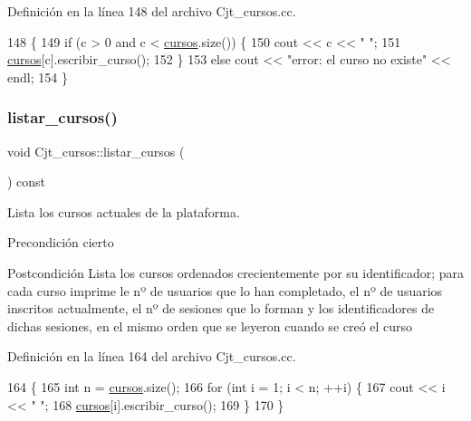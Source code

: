 Definición en la línea 148 del archivo Cjt\+\_\+cursos.\+cc.


\begin{DoxyCode}
148                                                \{
149       \textcolor{keywordflow}{if} (c > 0 and c < \mbox{\hyperlink{class_cjt__cursos_a582f9540bc295212450dba4cd18c8886}{cursos}}.size()) \{
150         cout << c << \textcolor{stringliteral}{" "};
151         \mbox{\hyperlink{class_cjt__cursos_a582f9540bc295212450dba4cd18c8886}{cursos}}[c].escribir\_curso();
152       \}
153       \textcolor{keywordflow}{else} cout << \textcolor{stringliteral}{"error: el curso no existe"} << endl;
154     \}
\end{DoxyCode}
\mbox{\label{class_cjt__cursos_abba27f9593cae77bf02909a06454ec43}} 
\subsubsection{\texorpdfstring{listar\+\_\+cursos()}{listar\_cursos()}}
{\footnotesize\ttfamily void Cjt\+\_\+cursos\+::listar\+\_\+cursos (\begin{DoxyParamCaption}{ }\end{DoxyParamCaption}) const}



Lista los cursos actuales de la plataforma. 

\begin{DoxyPrecond}{Precondición}
cierto 
\end{DoxyPrecond}
\begin{DoxyPostcond}{Postcondición}
Lista los cursos ordenados crecientemente por su identificador; para cada curso imprime le nº de usuarios que lo han completado, el nº de usuarios inscritos actualmente, el nº de sesiones que lo forman y los identificadores de dichas sesiones, en el mismo orden que se leyeron cuando se creó el curso 
\end{DoxyPostcond}


Definición en la línea 164 del archivo Cjt\+\_\+cursos.\+cc.


\begin{DoxyCode}
164                                          \{
165       \textcolor{keywordtype}{int} n = \mbox{\hyperlink{class_cjt__cursos_a582f9540bc295212450dba4cd18c8886}{cursos}}.size();
166       \textcolor{keywordflow}{for} (\textcolor{keywordtype}{int} i = 1; i < n; ++i) \{
167         cout << i << \textcolor{stringliteral}{" "};
168         \mbox{\hyperlink{class_cjt__cursos_a582f9540bc295212450dba4cd18c8886}{cursos}}[i].escribir\_curso();
169       \}
170     \}
\end{DoxyCode}


